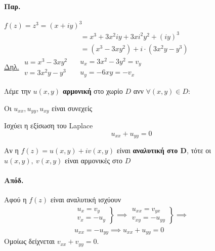 \documentclass[12pt,a4paper,notitlepage,fleqn]{article}
\begin{document}
	\paragraph{Παρ.}
	\( f(z) = z^3 = (x+iy)^3 \)
	\begin{align*}
		&= x^3+3x^2iy+3xi^2y^2+(iy)^3 \\
		&= (x^3-3xy^2) + i \cdot (3x^2y-y^3)
	\end{align*}
	\underline{Δηλ.} \(
	\begin{array}{l}
	u=x^3-3xy^2 \\ v=3x^2y-y^3
	\end{array} \quad \begin{array}{l}
	u_x = 3x^2-3y^2 = v_y \\
	u_y = -6xy = - v_x
	\end{array}
	 \)

	\begin{defn*}{}
		Λέμε την \( u(x,y) \) \textbf{αρμονική} στο χωρίο \( D \) ανν \( \forall (x,y)\in D\):
		\begin{enumgreekparen}
			\item Οι \( u_{xx},u_{yy},u_{xy} \) είναι συνεχείς
			\item Ισχύει η εξίσωση του Laplace \[
			\boxed{u_{xx} + u_{yy} = 0}
			\]
		\end{enumgreekparen}
	\end{defn*}

	\begin{theorem*}{}
		Αν η \( f(z) = u(x,y)+iv(x,y) \) είναι \textbf{αναλυτική στο \( \mathbf D \)}, τότε
		οι \( u(x,y),\ v(x,y) \) είναι αρμονικές στο \( D \)
	\end{theorem*}
	\paragraph{Απόδ.}
	Αφού η \( f(z) \) είναι αναλυτική ισχύουν
	\begin{gather*} \left.
		\begin{array}{l}
		u_x = v_y \\ v_x = -u_y
		\end{array} \right\rbrace \implies \left. \begin{array}{l}
		u_{xx} = v_{yx} \\ v_{xy} = -u_{yy}
		\end{array} \right\rbrace \implies \\
		u_{xx} = - u_{yy} \implies u_{xx}+u_{yy} = 0
			\end{gather*}
		Ομοίως δείχνεται \( v_{xx} + v_{yy} = 0 \).
\end{document}
